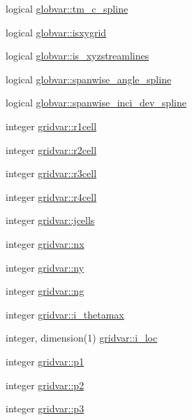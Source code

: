 \begin{DoxyCompactItemize}
\item 
logical \hyperlink{namespaceglobvar_a7ef07561b1935adec053ae70c03ec46f}{globvar\+::tm\+\_\+c\+\_\+spline}
\item 
logical \hyperlink{namespaceglobvar_a2432df148a05363a1a9054a0401bc8ac}{globvar\+::isxygrid}
\item 
logical \hyperlink{namespaceglobvar_ac05346905a5106a2caa9e00cbee2e308}{globvar\+::is\+\_\+xyzstreamlines}
\item 
logical \hyperlink{namespaceglobvar_abac88288cb1b27c8e386787aaf593171}{globvar\+::spanwise\+\_\+angle\+\_\+spline}
\item 
logical \hyperlink{namespaceglobvar_a5669ea00f010c1d3530ecb52446dd4fb}{globvar\+::spanwise\+\_\+inci\+\_\+dev\+\_\+spline}
\item 
integer \hyperlink{namespacegridvar_a82471622d62aa32eee56a7b6be0cde37}{gridvar\+::r1cell}
\item 
integer \hyperlink{namespacegridvar_a3203ed7e5fd550ecd3db28a984a98e67}{gridvar\+::r2cell}
\item 
integer \hyperlink{namespacegridvar_a9f25f936a91b900f3c0e92756b058baf}{gridvar\+::r3cell}
\item 
integer \hyperlink{namespacegridvar_a95fdf111ad0de8db538800047d39fe2c}{gridvar\+::r4cell}
\item 
integer \hyperlink{namespacegridvar_a8b64d7e709991664741ab52bd2cc4b0b}{gridvar\+::jcells}
\item 
integer \hyperlink{namespacegridvar_ac50c143a371abc586b838320ddc88fdc}{gridvar\+::nx}
\item 
integer \hyperlink{namespacegridvar_a8fa1d0ca6197d12780fa0fae9b209c07}{gridvar\+::ny}
\item 
integer \hyperlink{namespacegridvar_ab9c5f3a5fcee79ab6ab60e5eeeddba0b}{gridvar\+::ng}
\item 
integer \hyperlink{namespacegridvar_aa21ca71efd849f646cd7117ae4548ba3}{gridvar\+::i\+\_\+thetamax}
\item 
integer, dimension(1) \hyperlink{namespacegridvar_aa2cdf2ef709244cb5a8170e1d0a75e6f}{gridvar\+::i\+\_\+loc}
\item 
integer \hyperlink{namespacegridvar_a07e7022df38416a6d673644deb5b1c9e}{gridvar\+::p1}
\item 
integer \hyperlink{namespacegridvar_a533dcfeb986dc18e2b0db537c859c6b7}{gridvar\+::p2}
\item 
integer \hyperlink{namespacegridvar_a86eca560e31b5be73bfcdd95c5b4be72}{gridvar\+::p3}
\item 

\end{DoxyCompactItemize}
